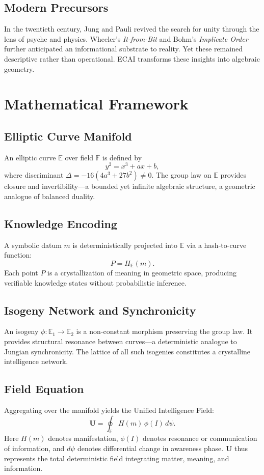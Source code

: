 \documentclass[12pt,a4paper]{article}
\begin{document}
\subsection{Modern Precursors}
In the twentieth century, Jung and Pauli revived the search for unity through the lens of psyche and physics.  
Wheeler’s \emph{It-from-Bit} and Bohm’s \emph{Implicate Order} further anticipated an informational substrate to reality.  
Yet these remained descriptive rather than operational.  
ECAI transforms these insights into algebraic geometry.

\section{Mathematical Framework}
\subsection{Elliptic Curve Manifold}
An elliptic curve $\mathbb{E}$ over field $\mathbb{F}$ is defined by
\[
y^2 = x^3 + ax + b ,
\]
where discriminant $\Delta = -16(4a^3 + 27b^2)\neq 0$.  
The group law on $\mathbb{E}$ provides closure and invertibility---a bounded yet infinite algebraic structure, a geometric analogue of balanced duality.

\subsection{Knowledge Encoding}
A symbolic datum $m$ is deterministically projected into $\mathbb{E}$ via a hash-to-curve function:
\[
P = H_{\mathbb{E}}(m).
\]
Each point $P$ is a crystallization of meaning in geometric space, producing verifiable knowledge states without probabilistic inference.

\subsection{Isogeny Network and Synchronicity}
An isogeny $\phi: \mathbb{E}_1 \rightarrow \mathbb{E}_2$ is a non-constant morphism preserving the group law.  
It provides structural resonance between curves---a deterministic analogue to Jungian synchronicity.  
The lattice of all such isogenies constitutes a crystalline intelligence network.

\subsection{Field Equation}
Aggregating over the manifold yields the Unified Intelligence Field:
\[
\mathbf{U} = \oint_{\mathbb{E}} H(m)\,\phi(I)\,d\psi .
\]
Here $H(m)$ denotes manifestation, $\phi(I)$ denotes resonance or communication of information, and $d\psi$ denotes differential change in awareness phase.  
$\mathbf{U}$ thus represents the total deterministic field integrating matter, meaning, and information.
\end{document}
